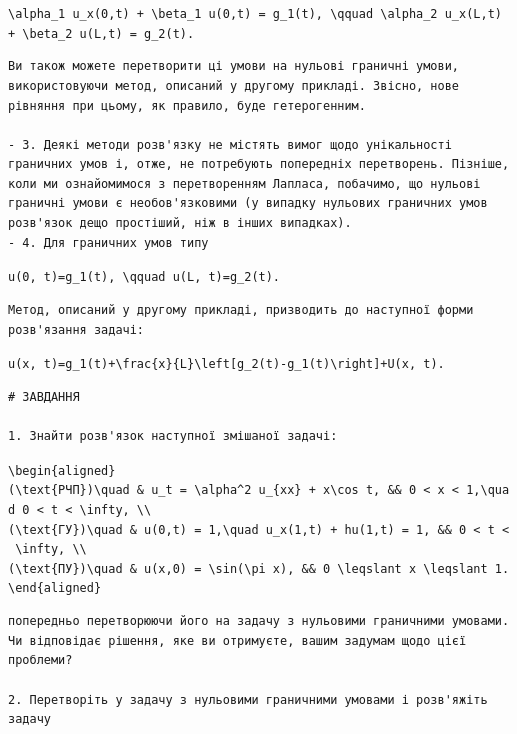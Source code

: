\documentclass[
  ukrainian,
]{article}
\begin{document}
\texttt{\textbackslash{}alpha\_1\ u\_x(0,t)\ +\ \textbackslash{}beta\_1\ u(0,t)\ =\ g\_1(t),\ \textbackslash{}qquad\ \textbackslash{}alpha\_2\ u\_x(L,t)\ +\ \textbackslash{}beta\_2\ u(L,t)\ =\ g\_2(t).}

\begin{verbatim}
Ви також можете перетворити ці умови на нульові граничні умови, використовуючи метод, описаний у другому прикладі. Звісно, нове рівняння при цьому, як правило, буде гетерогенним.

- 3. Деякі методи розв'язку не містять вимог щодо унікальності граничних умов і, отже, не потребують попередніх перетворень. Пізніше, коли ми ознайомимося з перетворенням Лапласа, побачимо, що нульові граничні умови є необов'язковими (у випадку нульових граничних умов розв'язок дещо простіший, ніж в інших випадках).
- 4. Для граничних умов типу
\end{verbatim}

\texttt{u(0,\ t)=g\_1(t),\ \textbackslash{}qquad\ u(L,\ t)=g\_2(t).}

\begin{verbatim}
Метод, описаний у другому прикладі, призводить до наступної форми розв'язання задачі:
\end{verbatim}

\texttt{u(x,\ t)=g\_1(t)+\textbackslash{}frac\{x\}\{L\}\textbackslash{}left{[}g\_2(t)-g\_1(t)\textbackslash{}right{]}+U(x,\ t).}

\begin{verbatim}
# ЗАВДАННЯ

1. Знайти розв'язок наступної змішаної задачі:
\end{verbatim}

\texttt{\textbackslash{}begin\{aligned\}}
\texttt{(\textbackslash{}text\{РЧП\})\textbackslash{}quad\ \&\ u\_t\ =\ \textbackslash{}alpha\^{}2\ u\_\{xx\}\ +\ x\textbackslash{}cos\ t,\ \&\&\ 0\ \textless{}\ x\ \textless{}\ 1,\textbackslash{}quad\ 0\ \textless{}\ t\ \textless{}\ \textbackslash{}infty,\ \textbackslash{}\textbackslash{}}
\texttt{(\textbackslash{}text\{ГУ\})\textbackslash{}quad\ \&\ u(0,t)\ =\ 1,\textbackslash{}quad\ u\_x(1,t)\ +\ hu(1,t)\ =\ 1,\ \&\&\ 0\ \textless{}\ t\ \textless{}\ \textbackslash{}infty,\ \textbackslash{}\textbackslash{}}
\texttt{(\textbackslash{}text\{ПУ\})\textbackslash{}quad\ \&\ u(x,0)\ =\ \textbackslash{}sin(\textbackslash{}pi\ x),\ \&\&\ 0\ \textbackslash{}leqslant\ x\ \textbackslash{}leqslant\ 1.}
\texttt{\textbackslash{}end\{aligned\}}

\begin{verbatim}
попередньо перетворюючи його на задачу з нульовими граничними умовами. Чи відповідає рішення, яке ви отримуєте, вашим задумам щодо цієї проблеми?

2. Перетворіть у задачу з нульовими граничними умовами і розв'яжіть задачу
\end{verbatim}
\end{document}
